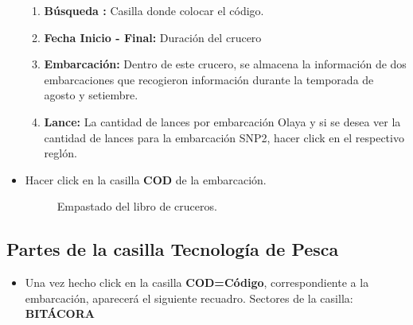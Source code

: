 \documentclass[a4paper,oneside,11pt]{book}
\begin{document}
\begin{itemize}
\begin{enumerate}
\item  \textbf{Búsqueda :} Casilla donde colocar el código.
\item \textbf{Fecha Inicio - Final:} Duración del crucero
\item \textbf{Embarcación:} Dentro de este crucero, se almacena la información de dos embarcaciones que recogieron información durante la temporada de agosto y setiembre.
\item  \textbf{Lance:} La cantidad de lances por embarcación Olaya y si se desea ver la cantidad de lances para la embarcación SNP2, hacer click en el respectivo reglón.
\end{enumerate}

\item Hacer click en la casilla \textbf{COD} de la embarcación.
 
  \begin{figure} [!h]
       \begin{center}
        \caption{Empastado del libro de cruceros.}
       \end{center}
        \end{figure}
  \end{itemize}
 
 
 \newpage


 \subsection{ Partes de la casilla Tecnología de Pesca}
 \begin{itemize}
\item [] Una vez hecho click en la casilla \textbf{COD=Código}, correspondiente a la embarcación, aparecerá el siguiente recuadro. Sectores de la casilla: \textbf{BITÁCORA}
 \end{itemize}
 
\end{document}

